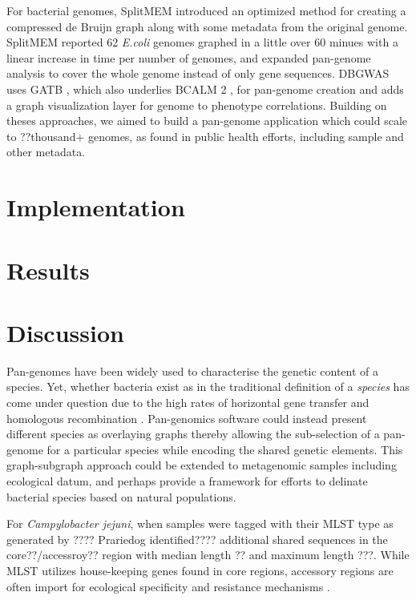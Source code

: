 \documentclass{article}
\begin{document}
For bacterial genomes, SplitMEM \cite{marcus2014splitmem} introduced an optimized method for creating a compressed de Bruijn graph along with some metadata from the original genome.
SplitMEM reported 62 \textit{E.coli} genomes graphed in a little over 60 minues with a linear increase in time per number of genomes, and expanded pan-genome analysis to cover the whole genome instead of only gene sequences.
DBGWAS \cite{jaillard2018fast} uses GATB \cite{drezen2014gatb}, which also underlies BCALM 2 \cite{chikhi2016compacting}, for pan-genome creation and adds a graph visualization layer for genome to phenotype correlations.
Building on theses approaches, we aimed to build a pan-genome application which could scale to ??thousand+ genomes, as found in public health efforts, including sample and other metadata.

\section{Implementation}

\section{Results}

\section{Discussion}

Pan-genomes have been widely used to characterise the genetic content of a species.
Yet, whether bacteria exist as in the traditional definition of a \textit{species} has come under question due to the high rates of horizontal gene transfer and homologous recombination \cite{fraser2009bacterial}.
Pan-genomics software could instead present different species as overlaying graphs thereby allowing the sub-selection of a pan-genome for a particular species while encoding the shared genetic elements.
This graph-subgraph approach could be extended to metagenomic samples including ecological datum, and perhaps provide a framework for efforts \cite{caro2012bacterial} to delinate bacterial species based on natural populations.


For \textit{Campylobacter jejuni}, when samples were tagged with their MLST type as generated by ???? Prariedog identified???? additional shared sequences in the core??/accessroy?? region with median length ?? and maximum length ???. %
While MLST utilizes house-keeping genes found in core regions, accessory regions are often import for ecological specificity and resistance mechanisms \cite{fraser2009bacterial}.
\end{document}
